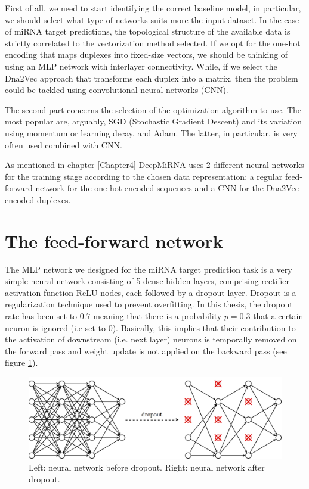 First of all, we need to start identifying the correct baseline model, in particular, we should select what type of networks suits more the input dataset. In the case of miRNA target predictions, the topological structure of the available data is strictly correlated to the vectorization method selected. If we opt for the one-hot encoding that maps duplexes into fixed-size vectors, we should be thinking of using an MLP network with interlayer connectivity. While, if we select the Dna2Vec approach that transforms each duplex into a matrix, then the problem could be tackled using convolutional neural networks (CNN)\cite{dl}.  

The second part concerns the selection of the optimization algorithm to use. The most popular are, arguably, SGD (Stochastic Gradient Descent) and its variation using momentum or learning decay, and Adam. The latter, in particular, is very often used combined with CNN.

As mentioned in chapter \ref{Chapter4} DeepMiRNA uses 2 different neural networks for the training stage according to the chosen data representation: a regular feed-forward network for the one-hot encoded sequences and a CNN for the Dna2Vec encoded duplexes. 

\section{The feed-forward network} 
The MLP network we designed for the miRNA target prediction task is a very simple neural network consisting of 5 dense hidden layers, comprising rectifier activation function ReLU nodes, each followed by a dropout layer. Dropout \cite{dropout} is a regularization technique used to prevent overfitting. In this thesis, the dropout rate has been set to $0.7$ meaning that there is a probability $p = 0.3$ that a certain neuron is ignored (i.e set to 0). Basically, this implies that their contribution to the activation of downstream (i.e. next layer) neurons is temporally removed on the forward pass and weight update is not applied on the backward pass (see figure \ref{fig:dropout}).

\begin{figure}[hbt!]
	\centering
	\includegraphics[width=\textwidth, height=0.3\textheight]{Figures/dropout}
	\caption{ Left: neural network before dropout. Right: neural network after dropout.}
	\label{fig:dropout}
\end{figure}   

